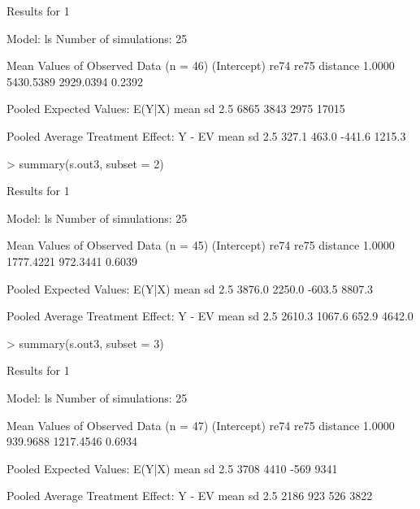 \begin{enumerate}
\begin{Schunk}
\begin{Soutput}
Results for 1 

  Model: ls 
  Number of simulations: 25 

Mean Values of Observed Data (n = 46) 
(Intercept)        re74        re75    distance 
     1.0000   5430.5389   2929.0394      0.2392 

Pooled Expected Values: E(Y|X)
 mean    sd  2.5% 97.5% 
 6865  3843  2975 17015 

Pooled Average Treatment Effect: Y - EV
  mean     sd   2.5%  97.5% 
 327.1  463.0 -441.6 1215.3 


\end{Soutput}
\begin{Sinput}
> summary(s.out3, subset = 2)
\end{Sinput}
\begin{Soutput}

Results for 1 

  Model: ls 
  Number of simulations: 25 

Mean Values of Observed Data (n = 45) 
(Intercept)        re74        re75    distance 
     1.0000   1777.4221    972.3441      0.6039 

Pooled Expected Values: E(Y|X)
  mean     sd   2.5%  97.5% 
3876.0 2250.0 -603.5 8807.3 

Pooled Average Treatment Effect: Y - EV
  mean     sd   2.5%  97.5% 
2610.3 1067.6  652.9 4642.0 


\end{Soutput}
\begin{Sinput}
> summary(s.out3, subset = 3)
\end{Sinput}
\begin{Soutput}

Results for 1 

  Model: ls 
  Number of simulations: 25 

Mean Values of Observed Data (n = 47) 
(Intercept)        re74        re75    distance 
     1.0000    939.9688   1217.4546      0.6934 

Pooled Expected Values: E(Y|X)
 mean    sd  2.5% 97.5% 
 3708  4410  -569  9341 

Pooled Average Treatment Effect: Y - EV
 mean    sd  2.5% 97.5% 
 2186   923   526  3822 


\end{Soutput}
\end{Schunk}
  

\end{enumerate}
